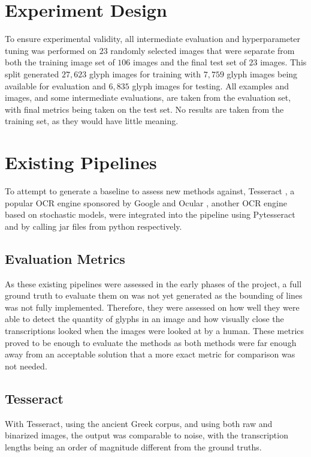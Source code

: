 \section{Experiment Design}

To ensure experimental validity, all intermediate evaluation and hyperparameter tuning was performed on $23$ randomly selected images that were separate from both the training image set of $106$ images and the final test set of $23$ images. This split generated $27,623$ glyph images for training with $7,759$ glyph images being available for evaluation and $6,835$ glyph images for testing. All examples and images, and some intermediate evaluations, are taken from the evaluation set, with final metrics being taken on the test set. No results are taken from the training set, as they would have little meaning.

\section{Existing Pipelines}

To attempt to generate a baseline to assess new methods against, Tesseract \cite{SmithTesseract}, a popular OCR engine sponsored by Google \cite{Vincent} and Ocular \cite{Berg-Kirkpatrick}, another OCR engine based on stochastic models, were integrated into the pipeline using Pytesseract \cite{Lee} and by calling jar files from python respectively.

\subsection{Evaluation Metrics}

As these existing pipelines were assessed in the early phases of the project, a full ground truth to evaluate them on was not yet generated as the bounding of lines was not fully implemented. Therefore, they were assessed on how well they were able to detect the quantity of glyphs in an image and how visually close the transcriptions looked when the images were looked at by a human. These metrics proved to be enough to evaluate the methods as both methods were far enough away from an acceptable solution that a more exact metric for comparison was not needed.

\subsection{Tesseract}

With Tesseract, using the ancient Greek corpus, and using both raw and binarized images, the output was comparable to noise, with the transcription lengths being an order of magnitude different from the ground truths.

